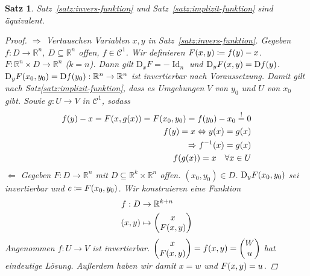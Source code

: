 \documentclass[11pt, twoside, a4paper]{article}
\theoremstyle{plain}
\newtheorem{satz}[blockelement]{Satz}
\numberwithin{equation}{subsection}
\newcommand{\pair}[1]{\left(#1\right)}
\newcommand{\of}[1]{\mathopen{}\mathclose{}\bgroup\left(#1\aftergroup\egroup\right)}
\newcommand{\equivalent}[0]{\Leftrightarrow{}}
\newcommand{\impl}[0]{\Rightarrow{}}
\newcommand{\fromto}{\rightarrow{}}
\newcommand{\annot}[3][]{\overset{\text{#3}}#1{#2}}
\newcommand{\anf}[1]{\glqq{}#1\grqq}
\DeclareMathOperator{\D}{D\!}
\DeclareMathOperator{\Id}{Id}
\newcommand{\R}{\mathbb{R}}
\newcommand{\mC}{\mathcal{C}}
\begin{document}
    \begin{satz} %
        Satz~\ref{satz:invers-funktion} und Satz~\ref{satz:implizit-funktion} sind äquivalent.
        \begin{proof}
            \anf{$\impl$} Vertauschen Variablen $x,y$ in Satz~\ref{satz:invers-funktion}. Gegeben $f: D\fromto\R^n$, $D\subseteq\R^n$ offen, $f\in\mC^{1}$. Wir definieren $F\of{x,y} \coloneqq f\of{y}-x$. $F:\R^n\times D\to\R^n$ ($k=n$). Dann gilt $\text{D}_x F = -\Id_{n}$ und $\text{D}_y F\of{x,y} = \D f\of{y}$.\\
            $\text{D}_y F\of{x_0, y_0} = \D f\of{y_0}: \R^n\fromto \R^n$ ist invertierbar nach Voraussetzung. Damit gilt nach Satz\ref{satz:implizit-funktion}, dass es Umgebungen $V$ von $y_0$ und $U$ von $x_0$ gibt. Sowie $g: U\to V$ in $\mC^1$, sodass
            \begin{align*}
                f\of{y} - x = F\of{x,g\of{x}} = F\of{x_0, y_0} = f\of{y_0} - x_0 \annot{=}{!} 0\\
                f\of{y} = x \equivalent y\of{x} = g\of{x}\\
                \impl f^{-1}\of{x} = g\of{x}\\
                f\of{g\of{x}} = x\quad\forall x\in U
            \end{align*}
            \anf{$\Leftarrow$} Gegeben $F: D\fromto\R^n$ mit $D\subseteq\R^k\times\R^n$ offen. $\pair{x_0, y_0}\in D$. $\text{D}_y F\of{x_0, y_0}$ sei invertierbar und $c\coloneqq F\of{x_0, y_0}$. Wir konstruieren eine Funktion
            \begin{align*}
                f: D&\to\R^{k+n}\\
                \pair{x,y}&\mapsto \begin{pmatrix}
                                       x \\
                                       F\of{x,y}
                \end{pmatrix}
            \end{align*}
            Angenommen $f: U\to V$ ist invertierbar. $\begin{pmatrix}
                                                          x\\F\of{x,y}
            \end{pmatrix} = f\of{x,y} = \begin{pmatrix}
                                            W \\
                                            u
            \end{pmatrix}$ hat eindeutige Lösung. Außerdem haben wir damit $x=w$ und $F\of{x,y} = u$.

\end{proof}
\end{satz}
\end{document}
